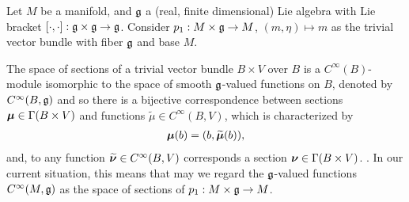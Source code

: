 Let $M$ be a manifold, and $\mathfrak{g}$ a (real, finite dimensional) Lie algebra with Lie bracket $[\cdot , \cdot]: \mathfrak{g} \times \mathfrak{g} \to \mathfrak{g}$. Consider $p_1: M \times \mathfrak{g} \to M$, $(m, \eta) \mapsto m$ as the trivial vector bundle with fiber $\mathfrak{g}$ and base $M$. %

The space of sections of a trivial vector bundle $B \times V$ over $B$ is a $C^\infty(B)$-module isomorphic to the space of smooth $\mathfrak{g}$-valued functions on $B$, denoted by $C^\infty(B, \mathfrak{g})$ and so 
there is a bijective correspondence between sections $\bm{\mu} \in \Gamma(B \times V)$ and functions $\tilde \mu \in C^\infty(B, V)$, which is characterized by
\begin{align} \label{defnTildeSect}
    \bm{\mu}(b) = (b, \widetilde{\bm{\mu}}(b)),
\end{align} and, to any function $\widetilde{\bm{\nu}} \in C^\infty(B, V)$ corresponds a section $\bm{\nu} \in \Gamma(B \times V)$. . In our current situation, this means that may we regard the $\mathfrak{g}$-valued functions $C^\infty(M, \mathfrak{g})$ as the space of sections of $p_1: M \times \mathfrak{g} \to M$.

